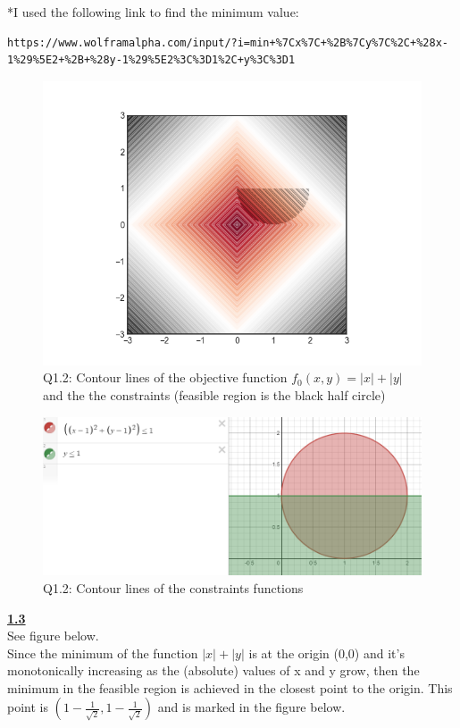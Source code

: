 \documentclass[fleqn]{article}
\begin{document}
*I used the following link to find the minimum value: \\
\begin{lstlisting}[breaklines]
https://www.wolframalpha.com/input/?i=min+%7Cx%7C+%2B%7Cy%7C%2C+%28x-1%29%5E2+%2B+%28y-1%29%5E2%3C%3D1%2C+y%3C%3D1
\end{lstlisting} 

\begin{figure}[h!]
\includegraphics[width=0.8\linewidth]{q1_2.PNG}
\caption{Q1.2: Contour lines of the objective function $f_0(x,y) = \lvert x\rvert +\lvert y \rvert$ and the the constraints (feasible region is the black half circle)}
\end{figure}


\begin{figure}[h!]
\includegraphics[width=0.8\linewidth]{q1_2_constraints_contours.PNG}
\caption{Q1.2: Contour lines of the constraints functions}
\end{figure}

\underline{\textbf{1.3}} \\
See figure below. \\

Since the minimum of the function  $\lvert x\rvert +\lvert y \rvert $ is at the origin (0,0) and it's monotonically increasing as the (absolute) values of x and y grow, then the minimum in the feasible region is achieved in the closest point to the origin. This point is $(1-\frac{1}{\sqrt{2}}, 1-\frac{1}{\sqrt{2}})$ and is marked in the figure below.\\
\end{document}
